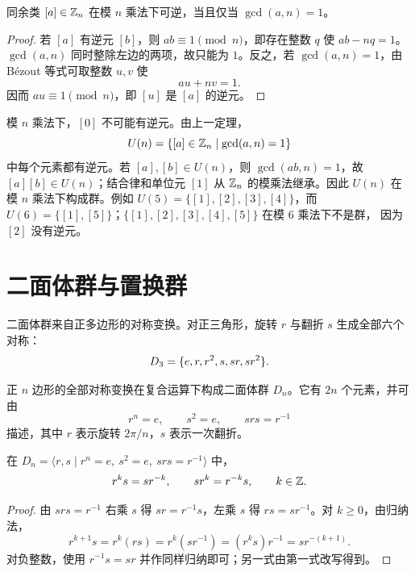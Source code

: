 \begin{theorem}[模乘法中可逆同余类的判定]\label{unit-mod-n}
  同余类 $[a]\in\mathbb{Z}_n$ 在模 $n$ 乘法下可逆，当且仅当 $\gcd(a,n)=1$。
\end{theorem}

\begin{proof}
  若 $[a]$ 有逆元 $[b]$，则 $ab\equiv1\pmod n$，即存在整数 $q$ 使
  $ab-nq=1$。$\gcd(a,n)$ 同时整除左边的两项，故只能为 $1$。反之，若
  $\gcd(a,n)=1$，由 Bézout 等式可取整数 $u,v$ 使
  \[
  au+nv=1.
  \]
  因而 $au\equiv1\pmod n$，即 $[u]$ 是 $[a]$ 的逆元。
\end{proof}

\begin{example}[title={模乘法中的可逆同余类}]\label{units-mod-n}
  模 $n$ 乘法下，$[0]$ 不可能有逆元。由上一定理，
  \[
  U(n)=\{[a]\in\mathbb{Z}_n\mid \gcd(a,n)=1\}
  \]
  中每个元素都有逆元。若 $[a],[b]\in U(n)$，则 $\gcd(ab,n)=1$，故
  $[a][b]\in U(n)$；结合律和单位元 $[1]$ 从 $\mathbb{Z}_n$ 的模乘法继承。因此
  $U(n)$ 在模 $n$ 乘法下构成群。例如 $U(5)=\{[1],[2],[3],[4]\}$，而
  $U(6)=\{[1],[5]\}$；$\{[1],[2],[3],[4],[5]\}$ 在模 $6$ 乘法下不是群，
  因为 $[2]$ 没有逆元。
\end{example}

\section{二面体群与置换群}

二面体群来自正多边形的对称变换。对正三角形，旋转 $r$ 与翻折 $s$ 生成全部六个对称：
\[
D_3=\{e,r,r^2,s,sr,sr^2\}.
\]


\begin{definition}[二面体群]\label{dihedral}
  正 $n$ 边形的全部对称变换在复合运算下构成二面体群 $D_n$。它有 $2n$ 个元素，并可由
  \[
  r^n=e,\qquad s^2=e,\qquad srs=r^{-1}
  \]
  描述，其中 $r$ 表示旋转 $2\pi/n$，$s$ 表示一次翻折。
\end{definition}

\begin{theorem}[二面体群的换序公式]\label{dihedral-reordering}
  在 $D_n=\langle r,s\mid r^n=e,\ s^2=e,\ srs=r^{-1}\rangle$ 中，
  \[
  r^ks=sr^{-k},\qquad sr^k=r^{-k}s,\qquad k\in\mathbb{Z}.
  \]
\end{theorem}

\begin{proof}
  由 $srs=r^{-1}$ 右乘 $s$ 得 $sr=r^{-1}s$，左乘 $s$ 得
  $rs=sr^{-1}$。对 $k\ge0$，由归纳法，
  \[
  r^{k+1}s=r^k(rs)=r^k(sr^{-1})=(r^ks)r^{-1}=sr^{-(k+1)}.
  \]
  对负整数，使用 $r^{-1}s=sr$ 并作同样归纳即可；另一式由第一式改写得到。
\end{proof}

